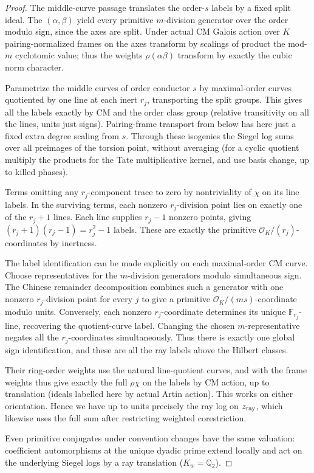 \begin{proof}
The middle-curve passage translates the order-\(s\) labels by a fixed split
ideal. The \((\alpha,\beta)\) yield every primitive \(m\)-division generator
over the order modulo sign, since the axes are split. Under actual CM Galois
action over \(K\) pairing-normalized frames on the axes transform by scalings
of product the mod-\(m\) cyclotomic value; thus the weights
\(\rho(\alpha\beta)\) transform by exactly the cubic norm character.

Parametrize the middle curves of order conductor \(s\) by maximal-order curves
quotiented by one line at each inert \(r_j\), transporting the split groups.
This gives all the labels exactly by CM and the order class group (relative
transitivity on all the lines, units just signs). Pairing-frame transport from
below has here just a fixed extra degree scaling from \(s\). Through these
isogenies the Siegel log sums over all preimages of the torsion point, without
averaging (for a cyclic quotient multiply the products for the Tate
multiplicative kernel, and use basis change, up to killed phases).

Terms omitting any \(r_j\)-component trace to zero by nontriviality of
\(\chi\) on its line labels. In the surviving terms, each nonzero
\(r_j\)-division point lies on exactly one of the \(r_j+1\) lines.  Each line
supplies \(r_j-1\) nonzero points, giving \((r_j+1)(r_j-1)=r_j^2-1\) labels.
These are exactly the primitive \(\mathcal O_K/(r_j)\)-coordinates by
inertness.

The label identification can be made explicitly on each maximal-order
CM curve. Choose representatives for the \(m\)-division generators
modulo simultaneous sign. The Chinese remainder decomposition combines
such a generator with one nonzero \(r_j\)-division point for every
\(j\) to give a primitive \(\mathcal O_K/(ms)\)-coordinate modulo
units. Conversely, each nonzero \(r_j\)-coordinate determines its
unique \(\mathbb F_{r_j}\)-line, recovering the quotient-curve
label. Changing the chosen \(m\)-representative negates all the
\(r_j\)-coordinates simultaneously. Thus there is exactly one
global sign identification, and these are all the ray labels above
the Hilbert classes.

Their ring-order weights use the natural line-quotient curves, and
with the frame weights thus
give exactly the full \(\rho\chi\) on the labels by CM action, up to
translation (ideals labelled here by actual Artin action). This works on
either orientation. Hence we have up to units precisely the ray log on
\(z_{\rm ray}\), which likewise uses the full sum after restricting weighted
corestriction.

Even primitive conjugates under convention changes have the same valuation:
coefficient automorphisms at the unique dyadic prime extend locally and act on
the underlying Siegel logs by a ray translation (\(K_w=\mathbb Q_2\)).
\end{proof}

